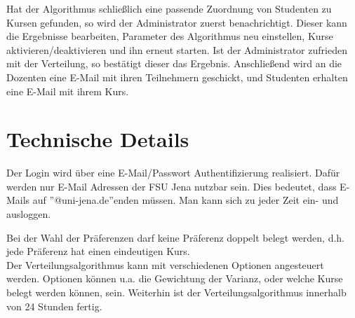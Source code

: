         Hat der Algorithmus schließlich eine passende Zuordnung von Studenten zu Kursen gefunden, so wird der Administrator zuerst benachrichtigt.
        Dieser kann die Ergebnisse bearbeiten, Parameter des Algorithmus neu einstellen, Kurse aktivieren/deaktivieren und ihn erneut starten.
        Ist der Administrator zufrieden mit der Verteilung, so bestätigt dieser das Ergebnis.
        Anschließend wird an die Dozenten eine E-Mail mit ihren Teilnehmern geschickt, und Studenten erhalten eine E-Mail mit ihrem Kurs.
    
    \section{Technische Details}
        Der Login wird über eine E-Mail/Passwort Authentifizierung realisiert.
        Dafür werden nur E-Mail Adressen der FSU Jena nutzbar sein. Dies bedeutet, dass E-Mails auf ''@uni-jena.de''enden müssen.
        Man kann sich zu jeder Zeit ein- und ausloggen.\newline
        
        Bei der Wahl der Präferenzen darf keine Präferenz doppelt belegt werden, d.h. jede Präferenz hat einen eindeutigen Kurs. \\ %
        
        Der Verteilungsalgorithmus kann mit verschiedenen Optionen angesteuert werden. Optionen können u.a. die Gewichtung der Varianz, oder welche Kurse belegt werden können, sein. Weiterhin ist der Verteilungsalgorithmus innerhalb von 24 Stunden fertig. \\
        

